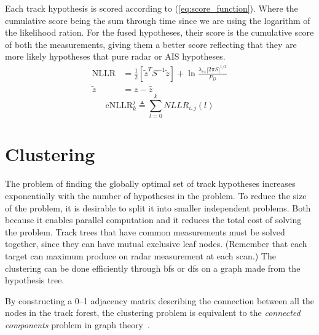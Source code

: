 Each \gls{track hypothesis} is scored according to (\ref{eq:score_function}). Where the cumulative score being the sum through time since we are using the logarithm of the likelihood ration. For the fused hypotheses, their score is the cumulative score of both the measurements, giving them a better score reflecting that they are more likely hypotheses that pure radar or AIS hypotheses. 
\begin{equation}\label{eq:score_function}
\begin{split}
\mathrm{NLLR} &= \frac{1}{2} \left[ {\tilde{z}}^{T} {S}^{-1} \tilde{z} \right] + \ln \frac{\lambda_{ex} |2 \pi S|^{1/2}} {P_D} \\				
\tilde{z} &= z -\hat{z}
\end{split}
\end{equation}
\begin{equation}
\mathrm{cNLLR}_k^j \triangleq \sum_{l=0}^k NLLR_{i,j}(l)
\end{equation}

\section{Clustering}
The problem of finding the globally optimal set of track hypotheses increases exponentially with the number of hypotheses in the problem. To reduce the size of the problem, it is desirable to split it into smaller independent problems. Both because it enables parallel computation and it reduces the total cost of solving the problem. Track trees that have common measurements must be solved together, since they can have mutual exclusive leaf nodes. (Remember that each target can maximum produce on radar measurement at each scan.) The clustering can be done efficiently through \gls{bfs} or \gls{dfs} on a graph made from the hypothesis tree.

By constructing a 0--1 adjacency matrix describing the connection between all the nodes in the track forest, the clustering problem is equivalent to the \emph{connected components} problem in graph theory~\cite{Chen2015}.

